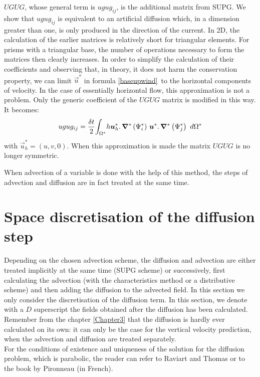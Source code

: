 $UGUG$, whose general term is $ugug_{ij}$, is the additional matrix from SUPG.
We show \cite{moulin93} that $ugug_{ij}$ is equivalent to an artificial
diffusion which, in a dimension greater than one, is only produced in the
direction of the current. In 2D, the calculation of the earlier matrices is
relatively short for triangular elements. For prisms with a triangular base,
the number of operations necessary to form the matrices then clearly
increases. In order to simplify the calculation of their coefficients and
observing that, in theory, it does not harm the conservation property, we can
limit $\vec{u}^{\ast}$ in formula \ref{baseupwind}\ to the horizontal
components of velocity. In the case of essentially horizontal flow, this
approximation is not a problem. Only the generic coefficient of the $UGUG$
matrix is modified in this way. It becomes:
\begin{equation}
ugug_{ij}=\dfrac{\delta t}{2}%
{\displaystyle\int\nolimits_{\Omega^{\ast}}}
h\vec{u}_{h}^{\ast}.\,\Grad^{\ast}\left(  \Psi
_{i}^{\ast}\right)  \,\vec{u}^{\ast}.\,\Grad^{\ast
}\left(  \Psi_{j}^{\ast}\right)  ~d\Omega^{\ast}%
\end{equation}
with $\vec{u}_{h}^{\ast}=(u,v,0)$. When this approximation is made
the matrix $UGUG$ is no longer symmetric.

When advection of a variable is done with the help of this method, the steps
of advection and diffusion are in fact treated at the same time.

\section{\label{diffusion 3D}Space discretisation of the diffusion step}

Depending on the chosen advection scheme, the diffusion and advection
are either treated implicitly at the same time (SUPG scheme) or successively,
first calculating the advection (with the characteristics method or a
distributive scheme) and then adding the diffusion to the advected
field. In this section we only consider the discretisation of the
diffusion term. In this section, we denote with a $D$ superscript
the fields obtained after the diffusion has been calculated.
Remember from the chapter \ref{Chapter3} that the diffusion is
hardly ever calculated on its own: it can only be the case for the
vertical velocity prediction, when the advection and diffusion are treated
separately. \\

For the conditions of existence and uniqueness of the solution for the diffusion
problem, which is parabolic, the reader can refer to Raviart and Thomas
\cite{raviart83} or to the book by Pironneau \cite{pironneau88} (in French).\\

